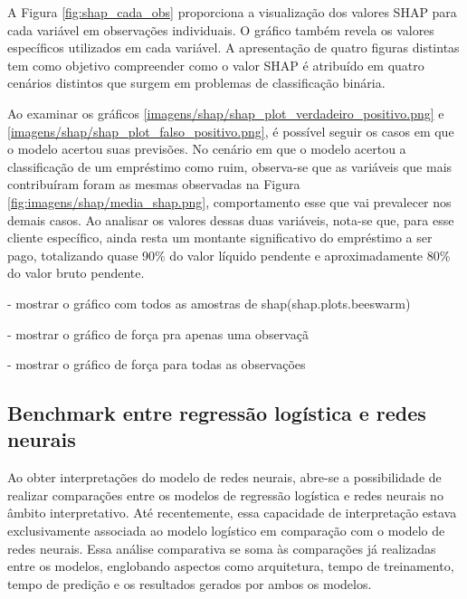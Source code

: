 A Figura \ref{fig:shap_cada_obs} proporciona a visualização dos valores SHAP para cada variável em observações individuais.
O gráfico também revela os valores específicos utilizados em cada variável. A apresentação de quatro figuras distintas tem
como objetivo compreender como o valor SHAP é atribuído em quatro cenários distintos que surgem em problemas de classificação binária.

Ao examinar os gráficos \ref{imagens/shap/shap_plot_verdadeiro_positivo.png} e \ref{imagens/shap/shap_plot_falso_positivo.png},
é possível seguir os casos em que o modelo acertou suas previsões. No cenário em que o modelo acertou a classificação de 
um empréstimo como ruim, observa-se que as variáveis que mais contribuíram foram as mesmas observadas na Figura \ref{fig:imagens/shap/media_shap.png}, 
comportamento esse que vai prevalecer nos demais casos.
Ao analisar os valores dessas duas variáveis, nota-se que, para esse cliente específico, ainda resta um montante significativo do empréstimo a ser pago, 
totalizando quase 90\% do valor líquido pendente e aproximadamente 80\% do valor bruto pendente.


- mostrar o gráfico com todos as amostras de shap(shap.plots.beeswarm)


- mostrar o gráfico de força pra apenas uma observaçã

- mostrar o gráfico de força para todas as observações



\subsection{Benchmark entre regressão logística e redes neurais }

Ao obter interpretações do modelo de redes neurais, abre-se a possibilidade de realizar comparações 
entre os modelos de regressão logística e redes neurais no âmbito interpretativo. Até recentemente, 
essa capacidade de interpretação estava exclusivamente associada ao modelo logístico em comparação com o modelo de redes neurais.
Essa análise comparativa se soma às comparações já realizadas entre os modelos, englobando aspectos como arquitetura,
tempo de treinamento,
tempo de predição e os resultados gerados por ambos os modelos.


